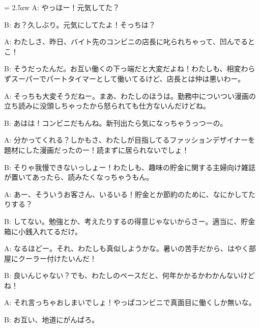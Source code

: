 \documentclass[11pt]{amsart}
\title{}
\author{}
\newenvironment{hangall}[1]{\hangindent = 2.5zw\everypar{\hangindent = 2.5zw}}{}
\begin{document}
\maketitle
\begin{hangall}{}%
A: やっほー！元気してた？

B: お？久しぶり。元気にしてたよ！そっちは？

A: わたしさ、昨日、バイト先のコンビニの店長に叱られちゃって、凹んでるとこ！

B: そうだったんだ。お互い働くの下っ端だと大変だよね！わたしも、相変わらずスーパーでパートタイマーとして働いてるけど、店長とは仲は悪いわー。

A: そっちも大変そうだねー。まあ、わたしのほうは。勤務中についつい漫画の立ち読みに没頭しちゃったから怒られても仕方ないんだけどね。

B: あはは！コンビニだもんね。新刊出たら気になっちゃうっつーの。

A: 分かってくれる？しかもさ、わたしが目指してるファッションデザイナーを題材にした漫画だったのー！読まずに居られないでしょ！

B: そりゃ我慢できないっしょー！わたしも、趣味の貯金に関する主婦向け雑誌が置いてあったら、読みたくなっちゃうもん。

A: あー、そういうお客さん、いるいる！貯金とか節約のために、なにかしてたりする？

B: してない。勉強とか、考えたりするの得意じゃないからさー。適当に、貯金箱に小銭入れてるだけ。

A: なるほどー。それ、わたしも真似しようかな。暑いの苦手だから、はやく部屋にクーラー付けたいんだ！

B: 良いんじゃない？でも、わたしのペースだと、何年かかるかわかんないけどね！

A: それ言っちゃおしまいでしょ！やっぱコンビニで真面目に働くしか無いな。

B: お互い、地道にがんばろ。
\end{hangall}
\end{document}
